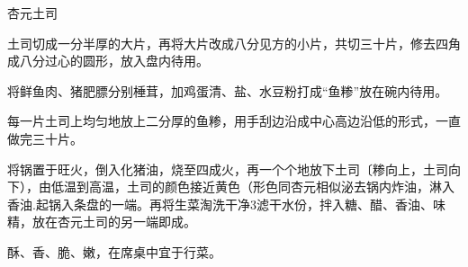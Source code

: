 \begin{recipe}{杏元土司}

\ingredients


\cooking

\step 土司切成一分半厚的大片，再将大片改成八分见方的小片，共切三十片，修去四角成八分过心的圆形，放入盘内待用。

\step 将鲜鱼肉、猪肥膘分别棰茸，加鸡蛋清、盐、水豆粉打成“鱼糁”放在碗内待用。

\step 每一片土司上均匀地放上二分厚的鱼糁，用手刮边沿成中心高边沿低的形式，一直做完三十片。

\step 将锅置于旺火，倒入化猪油，烧至四成火，再一个个地放下土司〔糁向上，土司向下），由低温到高温，土司的颜色接近黄色（形色同杏元相似泌去锅内炸油，淋入香油.起锅入条盘的一端。再将生菜淘洗干净3滤干水份，拌入糖、醋、香油、味精，放在杏元土司的另一端即成。

\notes

酥、香、脆、嫩，在席桌中宜于行菜。

\end{recipe}

